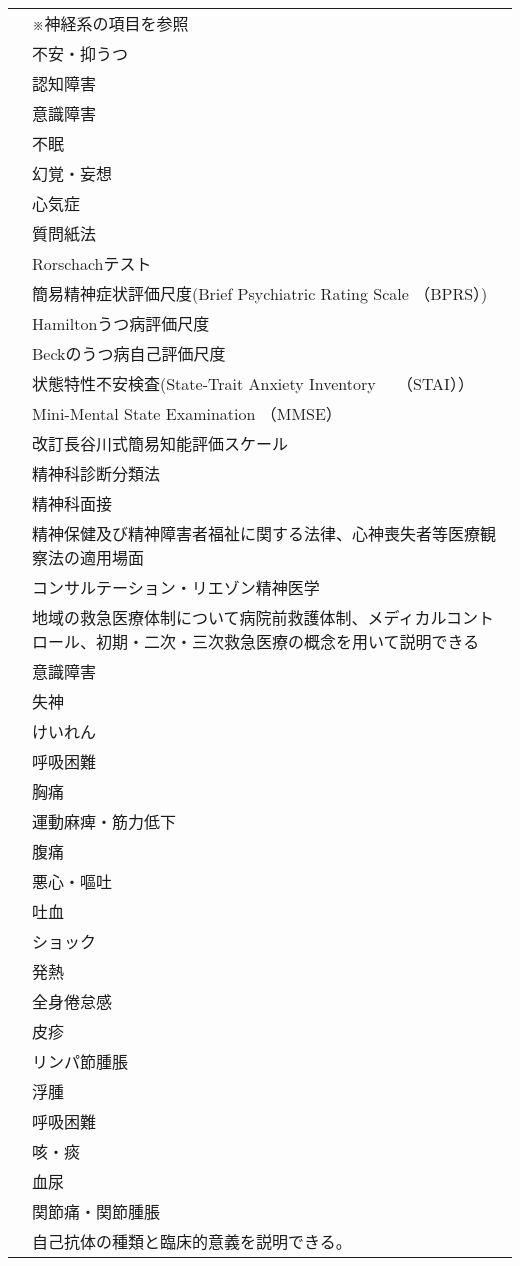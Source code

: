 \begin{xltabular}{\linewidth}{XX}
 & ※神経系の項目を参照 \\
 & 不安・抑うつ \\
 & 認知障害 \\
 & 意識障害 \\
 & 不眠 \\
 & 幻覚・妄想 \\
 & 心気症 \\
 & 質問紙法 \\
 & Rorschachテスト \\
 & 簡易精神症状評価尺度(Brief Psychiatric Rating Scale （BPRS）) \\
 & Hamiltonうつ病評価尺度 \\
 & Beckのうつ病自己評価尺度 \\
 & 状態特性不安検査(State-Trait Anxiety Inventory　 （STAI）） \\
 & Mini-Mental State Examination （MMSE） \\
 & 改訂長谷川式簡易知能評価スケール \\
 & 精神科診断分類法 \\
 & 精神科面接 \\
 & 精神保健及び精神障害者福祉に関する法律、心神喪失者等医療観察法の適用場面 \\
 & コンサルテーション・リエゾン精神医学 \\
 & 地域の救急医療体制について病院前救護体制、メディカルコントロール、初期・二次・三次救急医療の概念を用いて説明できる \\
 & 意識障害 \\
 & 失神 \\
 & けいれん \\
 & 呼吸困難 \\
 & 胸痛 \\
 & 運動麻痺・筋力低下 \\
 & 腹痛 \\
 & 悪心・嘔吐 \\
 & 吐血 \\
 & ショック \\
 & 発熱 \\
 & 全身倦怠感 \\
 & 皮疹 \\
 & リンパ節腫脹 \\
 & 浮腫 \\
 & 呼吸困難 \\
 & 咳・痰 \\
 & 血尿 \\
 & 関節痛・関節腫脹 \\
 & 自己抗体の種類と臨床的意義を説明できる。 \\

\end{xltabular}
